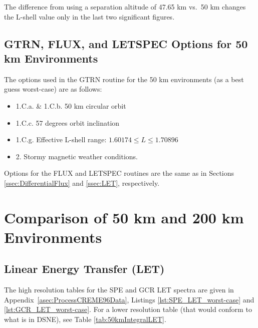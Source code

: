 \documentclass{hitec}
\begin{document}
The difference from using a separation altitude of 47.65 km vs.\ 50 km changes the L-shell value only in the last two significant figures.

\subsection{\textsf{GTRN}, \textsf{FLUX}, and \textsf{LETSPEC} Options for 50 km Environments}
The options used in the \textsf{GTRN} routine for the 50 km environments (as a best guess worst-case) are as follows:

\begin{itemize}
	\item 1.C.a. \& 1.C.b. 50 km circular orbit
	\item 1.C.c. 57 degrees orbit inclination
	\item 1.C.g. Effective L-shell range: $1.60174 \le L \le 1.70896$
	\item 2. Stormy magnetic weather conditions.
\end{itemize}

Options for the \textsf{FLUX} and \textsf{LETSPEC} routines are the same as in Sections \ref{ssec:DifferentialFlux} and \ref{ssec:LET}, respectively.


\section{Comparison of 50 km and 200 km Environments}\label{sec:ComparisonOf50kmAnd200kmEnvironments}

\subsection{Linear Energy Transfer (LET)}

The high resolution tables for the SPE and GCR LET spectra are given in Appendix~\ref{asec:ProcessCREME96Data}, Listings \ref{lst:SPE_LET_worst-case} and \ref{lst:GCR_LET_worst-case}. For a lower resolution table (that would conform to what is in DSNE), see Table \ref{tab:50kmIntegralLET}.
\end{document}
